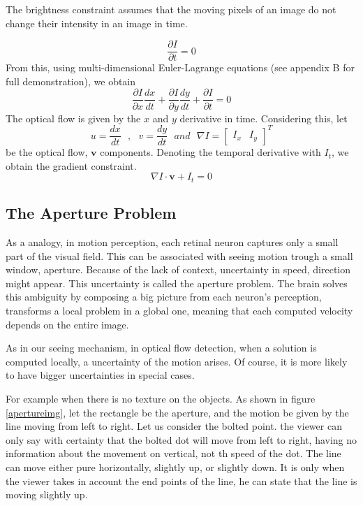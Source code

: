 \documentclass[12pt,a4paper,twoside]{report}
\begin{document}
The brightness constraint assumes that the moving pixels of an image do not change their intensity in an image in time.


\begin{equation}  \label{Idt0}
\frac{\partial I}{\partial t} = 0
\end{equation}
From this, using multi-dimensional Euler-Lagrange equations (see appendix B for full demonstration), we obtain
\begin{equation} \label{Idt0_lagr}
\frac{\partial I}{\partial x}\frac{dx}{dt} +
\frac{\partial I}{\partial y}\frac{dy}{dt} +
\frac{\partial I}{\partial t} = 0
\end{equation}
The optical flow is given by the $x$ and $y$ derivative in time. Considering this, let
\begin{equation}
u = \frac{dx}{dt} \ \ \ , \ \ \  v = \frac{dy}{dt} \ \ \ and \ \ \ \nabla I=\begin{bmatrix}
I_x & I_y
\end{bmatrix} ^T
\end{equation} 
be the optical flow, $\boldsymbol{v}$ components. Denoting the temporal derivative with $I_t$, we obtain the gradient constraint. 
\begin{equation}
	\nabla I \cdot \boldsymbol{v}+I_t = 0
\end{equation}


\subsection{The Aperture Problem}
As a analogy, in motion perception, each retinal neuron captures only a small part of the visual field. This can be associated with seeing motion trough a small window, aperture. Because of the lack of context, uncertainty in speed, direction might appear. This uncertainty is called the aperture problem.
The brain solves this ambiguity by composing a big picture from each neuron's perception, transforms a local problem in a global one, meaning that each computed velocity depends on the entire image.
 
 
As in our seeing mechanism, in optical flow detection, when a solution is computed locally, a uncertainty of the motion arises. Of course, it is more likely to have bigger uncertainties in special cases. 

For example when there is no texture on the objects. As shown in figure \ref{apertureimg}, let the rectangle be the aperture, and the motion be given by the line moving from left to right. Let us consider the bolted point. the viewer can only say with certainty that the bolted dot will move from left to right, having no information about the movement on vertical, not th speed of the dot. The line can move either pure horizontally, slightly up, or slightly down. It is only when the viewer takes in account the end points of the line, he can state that the line is moving slightly up.  
\end{document}
